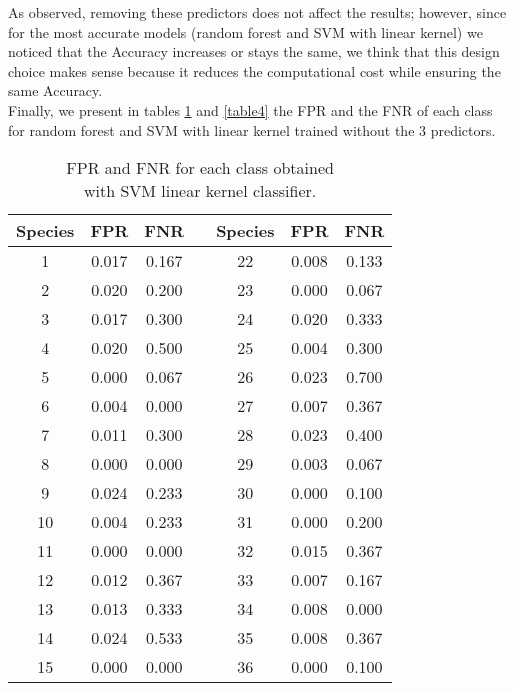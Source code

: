 \documentclass{article}
\begin{document}
As observed, removing these predictors does not affect the results; however, since for the most accurate models (random forest and SVM with linear kernel) we noticed that the Accuracy increases or stays the same, we think that this design choice makes sense because it reduces the computational cost while ensuring the same Accuracy.
\\Finally, we present in tables \ref{table3} and \ref{table4} the FPR and the FNR of each class for random forest and SVM with linear kernel trained without the $3$ predictors. 

\begin{table}[h]
\begin{minipage}[]{7cm}
 \begin{adjustwidth}{-3cm}{}
\begin{tabular}{|c|c|c|c|c|c|c| } \hline
Species & FPR & FNR & & Species & FPR & FNR \\
\hline
1 & 0.017 & 0.167 & & 22 & 0.008 & 0.133 \\ 
\hline
2 & 0.020 & 0.200 & & 23 & 0.000 & 0.067 \\ 
\hline
 3 & 0.017 & 0.300 & & 24 & 0.020 & 0.333\\ 
\hline
 4 & 0.020 & 0.500 & & 25 & 0.004 & 0.300 \\ 
\hline
 5 & 0.000 & 0.067 & & 26 & 0.023 & 0.700 \\ 
\hline
 6 & 0.004 & 0.000 & & 27 & 0.007 & 0.367 \\ 
\hline
 7 & 0.011 & 0.300 & & 28 & 0.023 & 0.400 \\ 
\hline
 8 & 0.000 & 0.000 & & 29 & 0.003 & 0.067 \\ 
\hline
 9 & 0.024 & 0.233 & & 30 & 0.000 & 0.100  \\ 
\hline
 10 & 0.004 & 0.233 & & 31 &  0.000 & 0.200 \\ 
\hline
 11 & 0.000 & 0.000 & & 32 & 0.015 & 0.367 \\ 
\hline
 12 & 0.012 & 0.367 & & 33 & 0.007 & 0.167\\ 
\hline
 13 & 0.013 & 0.333 & & 34 & 0.008 & 0.000\\ 
\hline
 14 & 0.024 & 0.533 & & 35 & 0.008 & 0.367\\ 
\hline
 15 & 0.000 & 0.000 & & 36 & 0.000 & 0.100\\  
\hline
\end{tabular}
\caption{FPR and FNR for each class obtained \\ with SVM linear kernel classifier.}\label{table3}
\end{adjustwidth}

\end{minipage}
\end{table}
\end{document}
